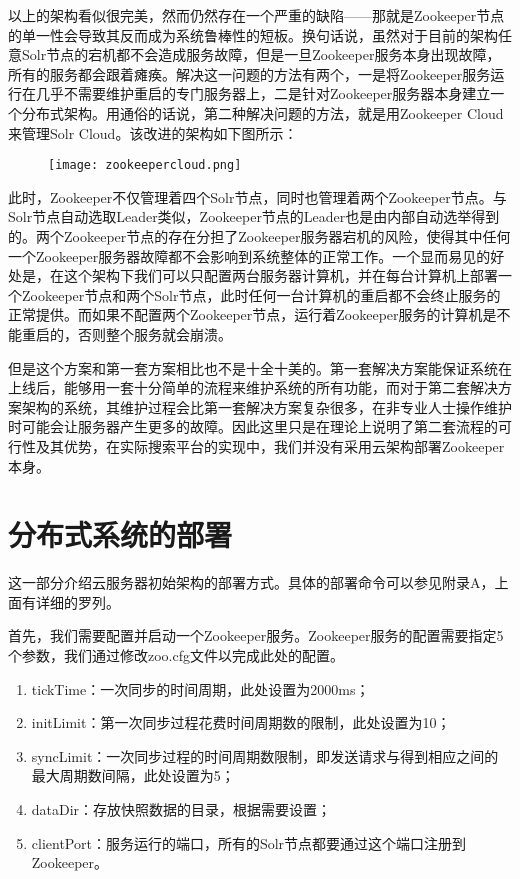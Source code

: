 以上的架构看似很完美，然而仍然存在一个严重的缺陷——那就是Zookeeper节点的单一性会导致其反而成为系统鲁棒性的短板。换句话说，虽然对于目前的架构任意Solr节点的宕机都不会造成服务故障，但是一旦Zookeeper服务本身出现故障，所有的服务都会跟着瘫痪。解决这一问题的方法有两个，一是将Zookeeper服务运行在几乎不需要维护重启的专门服务器上，二是针对Zookeeper服务器本身建立一个分布式架构。用通俗的话说，第二种解决问题的方法，就是用Zookeeper Cloud来管理Solr Cloud。该改进的架构如下图所示：
\begin{figure}[!htp]
  \centering
  \texttt{[image: zookeepercloud.png]}
\end{figure}
此时，Zookeeper不仅管理着四个Solr节点，同时也管理着两个Zookeeper节点。与Solr节点自动选取Leader类似，Zookeeper节点的Leader也是由内部自动选举得到的。两个Zookeeper节点的存在分担了Zookeeper服务器宕机的风险，使得其中任何一个Zookeeper服务器故障都不会影响到系统整体的正常工作。一个显而易见的好处是，在这个架构下我们可以只配置两台服务器计算机，并在每台计算机上部署一个Zookeeper节点和两个Solr节点，此时任何一台计算机的重启都不会终止服务的正常提供。而如果不配置两个Zookeeper节点，运行着Zookeeper服务的计算机是不能重启的，否则整个服务就会崩溃。

但是这个方案和第一套方案相比也不是十全十美的。第一套解决方案能保证系统在上线后，能够用一套十分简单的流程来维护系统的所有功能，而对于第二套解决方案架构的系统，其维护过程会比第一套解决方案复杂很多，在非专业人士操作维护时可能会让服务器产生更多的故障。因此这里只是在理论上说明了第二套流程的可行性及其优势，在实际搜索平台的实现中，我们并没有采用云架构部署Zookeeper本身。

\section{分布式系统的部署}
这一部分介绍云服务器初始架构的部署方式。具体的部署命令可以参见附录A，上面有详细的罗列。

首先，我们需要配置并启动一个Zookeeper服务。Zookeeper服务的配置需要指定5个参数，我们通过修改zoo.cfg文件以完成此处的配置。
\begin{enumerate}
\item tickTime：一次同步的时间周期，此处设置为2000ms；
\item initLimit：第一次同步过程花费时间周期数的限制，此处设置为10；
\item syncLimit：一次同步过程的时间周期数限制，即发送请求与得到相应之间的最大周期数间隔，此处设置为5；
\item dataDir：存放快照数据的目录，根据需要设置；
\item clientPort：服务运行的端口，所有的Solr节点都要通过这个端口注册到Zookeeper。
\end{enumerate}

